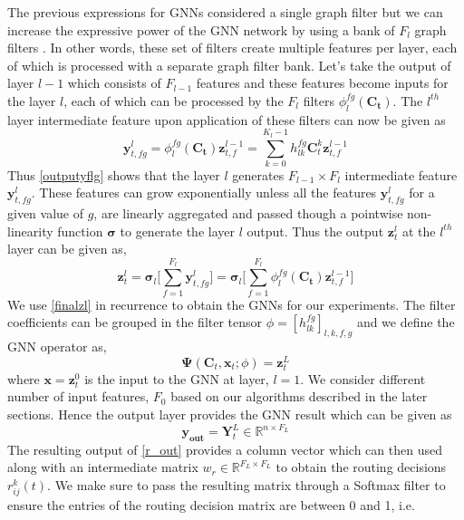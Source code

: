 \documentclass[lettersize,journal]{IEEEtran}
\begin{document}
The previous expressions for GNNs considered a single graph filter but we can increase the expressive power of the GNN network by using a bank of $F_l$ graph filters \cite{eisen2020optimal}. In other words, these set of filters create multiple features per layer, each of which is processed with a separate graph filter bank. Let's take the output of layer $l-1$ which consists of $F_{l-1}$ features and these features become inputs for the layer $l$, each of which can be processed by the $F_l$ filters $\phi_l^{fg}(\mathbf{C_t})$. The $l^{th}$ layer intermediate feature upon application of these filters can now be given as 
\begin{equation} \label{outputyflg}
    \mathbf{y}_{t,fg}^l = \phi_l^{fg}(\mathbf{C_t}) \mathbf{z}_{t,f}^{l-1} = \sum_{k=0}^{K_l-1}h_{lk}^{fg} \mathbf{C}_t^k \mathbf{z}_{t,f}^{l-1}
\end{equation}
Thus \eqref{outputyflg} shows that the layer $l$ generates $F_{l-1} \times F_l$ intermediate feature $\mathbf{y}_{t,fg}^l$. These features can grow exponentially unless all the features $\mathbf{y}_{t,fg}^l$ for a given value of $g$, are linearly aggregated and passed though a pointwise non-linearity function $\mathbf{\sigma}$ to generate the layer $l$ output. Thus the output $\mathbf{z}_t^l$ at the $l^{th}$ layer can be given as,
\begin{equation}\label{finalzl}
    \mathbf{z}_t^l = \mathbf{\sigma}_l \Bigg[\sum_{f=1}^{F_l} \mathbf{y}_{t,fg}^l \Bigg] = \mathbf{\sigma}_l \Bigg[\sum_{f=1}^{F_l} \phi_l^{fg}(\mathbf{C_t}) \mathbf{z}_{t,f}^{l-1} \Bigg]
\end{equation}
We use \eqref{finalzl} in recurrence to obtain the GNNs for our experiments. The filter coefficients can be grouped in the filter tensor $\phi = [h_{lk}^{fg}]_{l,k,f,g}$ and we define the GNN operator as,
\begin{equation}\label{phiout}
   \mathbf{\Psi}(\mathbf{C}_t,\mathbf{x}_t;\phi) = \mathbf{z}_t^L
\end{equation}
where $\mathbf{x} = \mathbf{z}_t^0$ is the input to the GNN at layer, $l=1$. We consider different number of input features, $F_0$ based on our algorithms described in the later sections. %
Hence the output layer provides the GNN result which can be given as
\begin{equation} \label{r_out}
    \mathbf{y_{out}} = \mathbf{Y}_t^L \in \mathbb{R}^{n \times F_L}
\end{equation}
The resulting output of \eqref{r_out} provides a column vector which can then used along with an intermediate matrix $w_r \in \mathbb{R}^{F_L \times F_L}$ to obtain the routing decisions $r_{ij}^k(t)$. We make sure to pass the resulting matrix through a Softmax filter to ensure the entries of the routing decision matrix are between 0 and 1, i.e.
\end{document}
